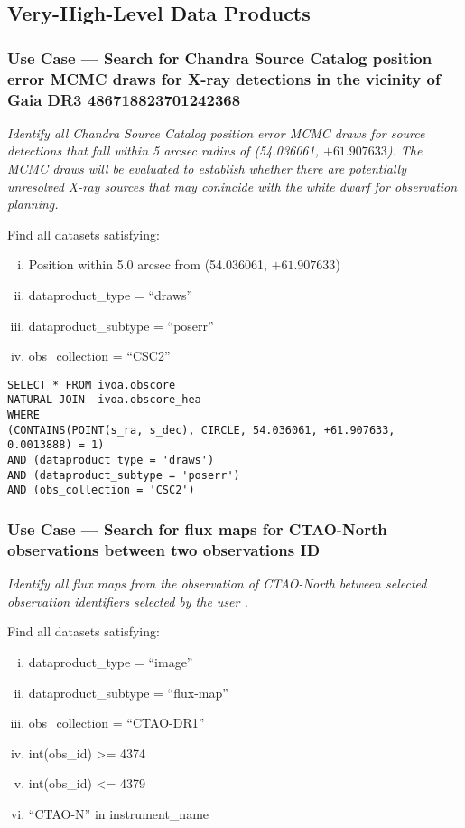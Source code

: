\subsection{Very-High-Level Data Products}

\subsubsection{Use Case --- Search for Chandra Source Catalog position error MCMC draws for X-ray detections in the vicinity of Gaia DR3 486718823701242368}

{\em Identify all Chandra Source Catalog position error MCMC draws for source detections that fall within 5 arcsec radius of  (54.036061, $+61.907633$).  The MCMC draws will be evaluated to establish whether there are potentially unresolved X-ray sources that may conincide with the white dwarf for observation planning.\/}

\medskip
\noindent Find all datasets satisfying:
\begin{enumerate}[(i)]
  \item Position within 5.0 arcsec from (54.036061, $+61.907633$)
  \item dataproduct\_type = ``draws''
  \item dataproduct\_subtype = ``poserr''
  \item obs\_collection = ``CSC2''
\end{enumerate}

\begin{verbatim}
SELECT * FROM ivoa.obscore
NATURAL JOIN  ivoa.obscore_hea
WHERE
(CONTAINS(POINT(s_ra, s_dec), CIRCLE, 54.036061, +61.907633, 0.0013888) = 1)
AND (dataproduct_type = 'draws')
AND (dataproduct_subtype = 'poserr')
AND (obs_collection = 'CSC2')
\end{verbatim}


\subsubsection{Use Case --- Search for flux maps for CTAO-North observations between two observations ID}

{\em Identify all flux maps from the observation of CTAO-North between selected observation identifiers selected by the user .\/}

\medskip
\noindent Find all datasets satisfying:
\begin{enumerate}[(i)]
  \item dataproduct\_type = ``image''
  \item dataproduct\_subtype = ``flux-map''
  \item obs\_collection = ``CTAO-DR1''
  \item int(obs\_id) >= 4374
  \item int(obs\_id) <= 4379
  \item ``CTAO-N'' in instrument\_name
\end{enumerate}

